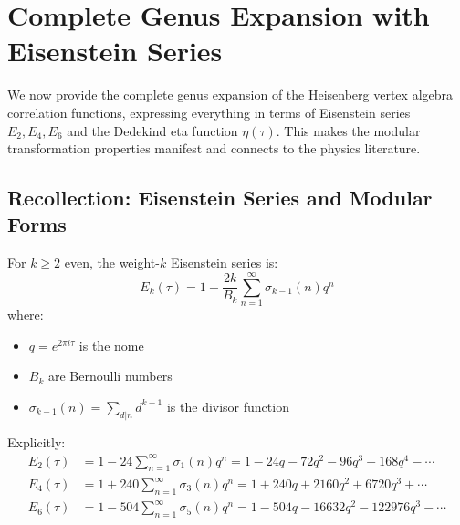 
\section{Complete Genus Expansion with Eisenstein Series}
\label{sec:heisenberg-genus-expansion-eisenstein}

We now provide the complete genus expansion of the Heisenberg vertex algebra 
correlation functions, expressing everything in terms of Eisenstein series 
$E_2, E_4, E_6$ and the Dedekind eta function $\eta(\tau)$. This makes the 
modular transformation properties manifest and connects to the physics literature.

\subsection{Recollection: Eisenstein Series and Modular Forms}
\label{subsec:eisenstein-recollection}

\begin{definition}\label{def:eisenstein-series}
For $k \geq 2$ even, the weight-$k$ Eisenstein series is:
\begin{equation}
E_k(\tau) = 1 - \frac{2k}{B_k} \sum_{n=1}^{\infty} \sigma_{k-1}(n) q^n
\end{equation}
where:
\begin{itemize}
\item $q = e^{2\pi i \tau}$ is the nome
\item $B_k$ are Bernoulli numbers
\item $\sigma_{k-1}(n) = \sum_{d|n} d^{k-1}$ is the divisor function
\end{itemize}

Explicitly:
\begin{align}
E_2(\tau) &= 1 - 24\sum_{n=1}^{\infty} \sigma_1(n) q^n 
= 1 - 24q - 72q^2 - 96q^3 - 168q^4 - \cdots \label{eq:E2-expansion} \\
E_4(\tau) &= 1 + 240\sum_{n=1}^{\infty} \sigma_3(n) q^n 
= 1 + 240q + 2160q^2 + 6720q^3 + \cdots \label{eq:E4-expansion} \\
E_6(\tau) &= 1 - 504\sum_{n=1}^{\infty} \sigma_5(n) q^n 
= 1 - 504q - 16632q^2 - 122976q^3 - \cdots \label{eq:E6-expansion}
\end{align}
\end{definition}

